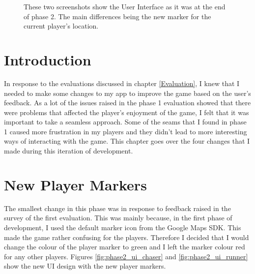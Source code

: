 \documentclass{l4proj}
\begin{document}
\begin{figure}
    \caption{These two screenshots show the User Interface as it was at the end of phase 2. The main
    differences being the new marker for the current player's location.
    }
\end{figure}

\section{Introduction}
In response to the evaluations discussed in chapter \ref{Evaluation}, I knew that I needed to make some changes to my app
to improve the game based on the user's feedback. As a lot of the issues raised in the phase 1 evaluation showed that
there were problems that affected the player's enjoyment of the game, I felt that it was important to take a seamless
approach. Some of the seams that I found in phase 1 caused more frustration in my players and they didn't lead to more
interesting ways of interacting with the game. This chapter goes over the four changes that I made during this
iteration of development.

\section{New Player Markers}
The smallest change in this phase was in response to feedback raised in the survey of the first evaluation. This was mainly
because, in the first phase of development, I used the default marker icon from the Google Maps SDK. This
made the game rather confusing for the players. Therefore I decided that I would change the colour of the player marker
to green and I left the marker colour red for any other players. Figures \ref{fig:phase2_ui_chaser} and \ref{fig:phase2_ui_runner}
show the new UI design with the new player markers.
\end{document}
